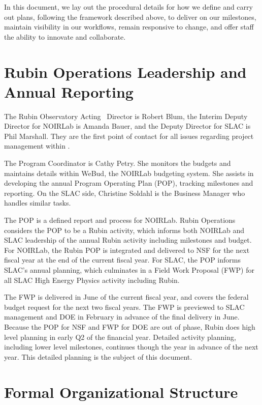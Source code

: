 In this document, we lay out the procedural details for how we define and carry out plans, following the framework described above, to deliver on our milestones, maintain visibility in our workflows, remain responsive to change, and offer staff the ability to innovate and collaborate.

\section{Rubin Operations Leadership and Annual Reporting}
\label{sec:contacts}

The Rubin Observatory Acting \ \gls{Director}  is Robert Blum, the Interim Deputy \gls{Director} for NOIRLab is Amanda Bauer, and the Deputy \gls{Director} for SLAC is Phil Marshall.
They are the first point of contact for all issues regarding project management within \RO.

The Program Coordinator is Cathy Petry.
She monitors the budgets and maintains details within WeBud, the NOIRLab budgeting system. 
She assists in developing the annual Program Operating Plan (POP), tracking milestones and reporting. 
On the SLAC side, Christine Soldahl is the Business Manager who handles similar tasks. 

The POP is a defined report and process for NOIRLab. 
Rubin Operations considers the POP to be a Rubin activity, which informs both NOIRLab and SLAC leadership of the annual Rubin activity including milestones and budget. 
For NOIRLab, the Rubin POP is integrated and delivered to NSF for the next fiscal year at the end of the current fiscal year. 
For SLAC, the POP informs SLAC's annual planning, which culminates in a Field Work Proposal (FWP) for all SLAC High Energy Physics activity including Rubin. 

The FWP is delivered in June of the current fiscal year, and covers the federal budget request for the next two fiscal years. 
The FWP is previewed to SLAC management and DOE in February in advance of the final delivery in June. 
Because the POP for NSF and FWP for DOE are out of phase, Rubin does high level planning in early Q2 of the financial year. 
Detailed activity planning, including lower level milestones, continues though the year in advance of the next year. 
This detailed planning is the subject of this document.

\section{Formal Organizational Structure}
\label{sec:structure}

